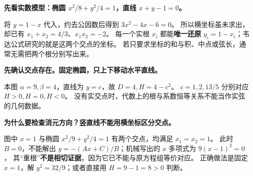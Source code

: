 \clearpage
\begin{explanationbox}
\textbf{先看实数模型：椭圆 $x^2/8+y^2/4=1$，直线 $x+y-1=0$。}

将 $y=1-x$ 代入，约去公因数后得到 $3x^2-4x-6=0$。
所以横坐标虽未求出，却已有 $x_1+x_2=4/3$、$x_1x_2=-2$。
每一个实根 $x_i$ 都能\textbf{唯一还原} $y_i=1-x_i$；韦达公式研究的就是这两个交点的坐标。
若只要求坐标的和与积、中点或弦长，通常无需把两个根分别写出来。

\tcbbreak
\textbf{先确认交点存在。固定椭圆，只上下移动水平直线。}

本图 $\alpha=9,\beta=4$，直线为 $y=c$，故 $D=4,H=4-c^2$。
$c=1,2,13/5$ 分别对应 $H>0,H=0,H<0$。
没有实交点时，代数上的根与系数恒等关系不能当作实弦的几何数据。

\tcbbreak
\textbf{为什么要检查消元方向？竖直线不能用横坐标区分交点。}

图中 $x=1$ 与椭圆 $x^2/9+y^2/4=1$ 有两个交点，均满足 $x_1=x_2=1$。
此时 $B=0$，不能解出 $y=-(Ax+C)/B$；机械写出的 $x$ 多项式为 $9(x-1)^2=0$，
其“重根”\textbf{不是相切证据}，因为它已不能与原方程组等价对应。
正确做法是固定 $x=1$，解 $y^2=32/9$；或者直接用 $H=9-1=8>0$ 判断。
\end{explanationbox}
